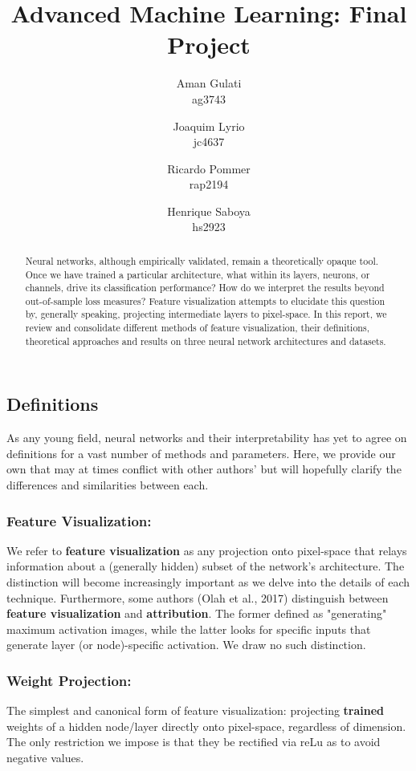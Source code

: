 \documentclass[12pt]{article}
\title{Advanced Machine Learning: Final Project}
\author{
	Aman Gulati \\
	ag3743 \\
	\and 
	Joaquim Lyrio  \\
	jc4637 \\
	\and 
	Ricardo Pommer \\
	rap2194 \\
	\and
	Henrique Saboya \\
	hs2923 \\
}
\begin{document}
\maketitle

\begin{abstract}
	Neural networks, although empirically validated, remain a theoretically opaque tool. Once we have trained a particular architecture, what within its layers, neurons, or channels, drive its classification performance? How do we interpret the results beyond out-of-sample loss measures? Feature visualization attempts to elucidate this question by, generally speaking, projecting intermediate layers to pixel-space. In this report,  we review and consolidate different methods of feature visualization, their definitions, theoretical approaches and results on three neural network architectures and datasets.
\end{abstract}

\subsection{Definitions}
As any young field, neural networks and their interpretability has yet to agree on definitions for a vast number of methods and parameters. Here, we provide our own that may at times conflict with other authors' but will hopefully clarify the differences and similarities between each.

\subsubsection{Feature Visualization:}
We refer to \textbf{feature visualization} as any projection onto pixel-space that relays information about a (generally hidden) subset of the network's architecture. The distinction will become increasingly important as we delve into the details of each technique. Furthermore, some authors (Olah et al., 2017) distinguish between \textbf{feature visualization} and \textbf{attribution}. The former defined as "generating" maximum activation images, while the latter looks for specific inputs that generate layer (or node)-specific activation. We draw no such distinction.

\subsubsection{Weight Projection:}
The simplest and canonical form of feature visualization: projecting \textbf{trained} weights of a hidden node/layer directly onto pixel-space, regardless of dimension. The only restriction we impose is that they be rectified via reLu as to avoid negative values.
\end{document}
